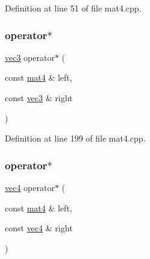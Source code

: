Definition at line 51 of file mat4.\+cpp.

\mbox{\label{structspork_1_1maths_1_1mat4_a4d8d620a16d3104dc5c96435d0d12530}} 
\subsubsection{\texorpdfstring{operator$\ast$}{operator*}\hspace{0.1cm}{\footnotesize\ttfamily [2/3]}}
{\footnotesize\ttfamily \hyperlink{structspork_1_1maths_1_1vec3}{vec3} operator$\ast$ (\begin{DoxyParamCaption}\item[{const \hyperlink{structspork_1_1maths_1_1mat4}{mat4} \&}]{left,  }\item[{const \hyperlink{structspork_1_1maths_1_1vec3}{vec3} \&}]{right }\end{DoxyParamCaption})\hspace{0.3cm}{\ttfamily [friend]}}



Definition at line 199 of file mat4.\+cpp.

\mbox{\label{structspork_1_1maths_1_1mat4_aa9a6ff23e02db1be9e45e89037029a1b}} 
\subsubsection{\texorpdfstring{operator$\ast$}{operator*}\hspace{0.1cm}{\footnotesize\ttfamily [3/3]}}
{\footnotesize\ttfamily \hyperlink{structspork_1_1maths_1_1vec4}{vec4} operator$\ast$ (\begin{DoxyParamCaption}\item[{const \hyperlink{structspork_1_1maths_1_1mat4}{mat4} \&}]{left,  }\item[{const \hyperlink{structspork_1_1maths_1_1vec4}{vec4} \&}]{right }\end{DoxyParamCaption})\hspace{0.3cm}{\ttfamily [friend]}}



